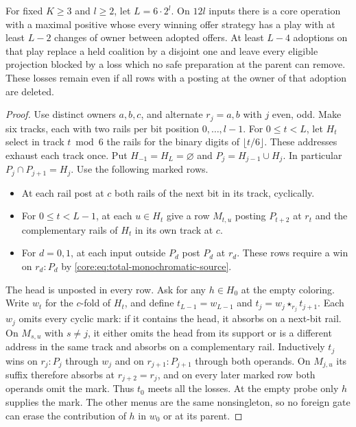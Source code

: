 \begin{theorem}
\label{core:thm:nested-adoption-path}
For fixed $K\ge3$ and $l\ge2$, let $L=6\cdot 2^l$. On $12l$
inputs there is a core operation with a maximal positive whose every
winning offer strategy has a play with at least $L-2$ changes of owner
between adopted offers. At least $L-4$ adoptions on that play replace
a held coalition by a disjoint one and leave every eligible projection
blocked by a loss which no safe preparation at the parent can remove.
These losses remain even if all rows with a posting at the owner of
that adoption are deleted.
\end{theorem}
\begin{proof}
Use distinct owners $a,b,c$, and alternate $r_j=a,b$ with $j$ even, odd.
Make six tracks, each with two rails per bit position $0,\ldots,l-1$.
For $0\le t<L$, let $H_t$ select in track $t\bmod6$ the rails for the
binary digits of $\lfloor t/6\rfloor$. These addresses exhaust each
track once. Put $H_{-1}=H_L=\varnothing$ and $P_j=H_{j-1}\cup H_j$.
In particular $P_j\cap P_{j+1}=H_j$. Use the following marked rows.
\begin{itemize}
\item At each rail post at $c$ both rails of the next bit in its
track, cyclically.
\item For $0\le t<L-1$, at each $u\in H_t$ give a row $M_{t,u}$ posting
$P_{t+2}$ at $r_t$ and the complementary rails of $H_t$ in its own
track at $c$.
\item For $d=0,1$, at each input outside $P_d$ post $P_d$ at $r_d$.
These rows require a win on $r_d:P_d$ by
\eqref{core:eq:total-monochromatic-source}.
\end{itemize}
The head is unposted in every row. Ask for any $h\in H_0$ at the empty
coloring. Write $w_t$ for the $c$-fold of $H_t$, and define
$t_{L-1}=w_{L-1}$ and $t_j=w_j\star_{r_j}t_{j+1}$.
Each $w_j$ omits every cyclic mark: if it contains the head, it
absorbs on a next-bit rail. On $M_{s,u}$ with $s\ne j$, it either
omits the head from its support or is a different address in the same
track and absorbs on a complementary rail. Inductively $t_j$ wins on
$r_j:P_j$ through $w_j$ and on $r_{j+1}:P_{j+1}$ through both
operands. On $M_{j,u}$ its suffix therefore absorbs at $r_{j+2}=r_j$,
and on every later marked row both operands omit the mark. Thus $t_0$
meets all the losses. At the empty probe only $h$ supplies the mark.
The other menus are the same nonsingleton, so no foreign gate can erase
the contribution of $h$ in $w_0$ or at its parent.


\end{proof}
